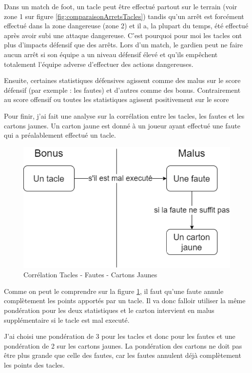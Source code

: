 \documentclass[a4paper,14pt]{extarticle}
\begin{document}
{Dans un match de foot, un tacle peut être effectué partout sur le terrain (voir zone 1 sur figure \ref{fig:comparaisonArretsTacles}) tandis qu'un arrêt est forcément effectué dans la zone dangereuse (zone 2) et il a, la plupart du temps, été effectué après avoir subi une attaque dangereuse. C'est pourquoi pour moi les tacles ont plus d'impacts défensif que des arrêts. Lors d'un match, le gardien peut ne faire aucun arrêt si son équipe a un niveau défensif élevé et qu'ils empêchent totalement l'équipe adverse d'effectuer des actions dangereuses. 

Ensuite, certaines statistiques défensives agissent comme des malus sur le score défensif (par exemple : les fautes) et d'autres comme des bonus. Contrairement au score offensif ou toutes les statistiques agissent positivement sur le score

Pour finir, j'ai fait une analyse sur la corrélation entre les tacles, les fautes et les cartons jaunes. Un carton jaune est donné à un joueur ayant effectué une faute qui a préalablement effectué un tacle.

\begin{figure}[H]
    \centering
    \includegraphics[width=15cm]{../img/schemaTacleFaute.png}
    \caption{Corrélation Tacles - Fautes - Cartons Jaunes}
    \label{fig:correlationTacleFaute}
\end{figure}

Comme on peut le comprendre sur la figure \ref{fig:correlationTacleFaute}, il faut qu'une faute annule complètement les points apportés par un tacle. Il va donc falloir utiliser la même pondération pour les deux statistiques et le carton intervient en malus supplémentaire si le tacle est mal executé.

J'ai choisi une pondération de 3 pour les tacles et donc pour les fautes et une pondération de 2 sur les cartons jaunes. La pondération des cartons ne doit pas être plus grande que celle des fautes, car les fautes annulent déjà complètement les points des tacles. 

}
\end{document}
